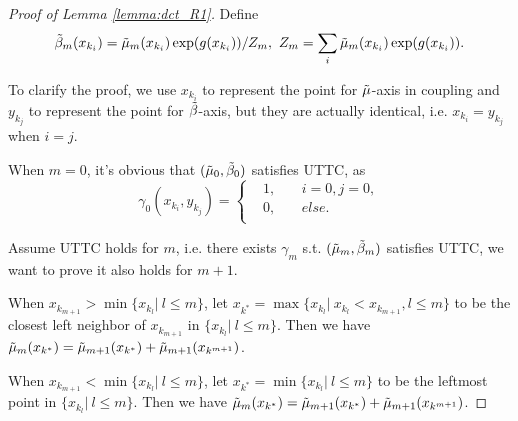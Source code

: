 \documentclass[nohyperref]{article}
\theoremstyle{plain}
\begin{document}
\begin{proof}[Proof of Lemma \ref{lemma:dct_R1}]
Define 
$$
\Tilde{\beta}_m (x_{k_i}) = \Tilde{\mu}_m (x_{k_i}) \exp(g(x_{k_i})) / Z_m,
\  Z_m = \sum_{i} \Tilde{\mu}_m (x_{k_i}) \exp (g(x_{k_i})).
$$ 

To clarify the proof, we use $x_{k_i}$ to represent the point for $\Tilde{\mu}$-axis in coupling and $y_{k_j}$ to represent the point for $\Tilde{\beta}$-axis, but they are actually identical, i.e. $x_{k_i} = y_{k_j}$ when $i = j$. 

When $m = 0$, it's obvious that $(\Tilde{\mu}_0, \Tilde{\beta}_0)$ satisfies UTTC, as 
\begin{equation*}
    \gamma_0 (x_{k_i}, y_{k_j}) = 
    \left\{
    \begin{aligned}
        &1,& &\ i=0, j=0,\\
        &0,& &\ else. \\
    \end{aligned}
    \right.
\end{equation*}

Assume UTTC holds for $m$, i.e. there exists $\gamma_m$ s.t. $(\Tilde{\mu}_m, \Tilde{\beta}_m)$ satisfies UTTC, we want to prove it also holds for $m+1$.

When $x_{k_{m+1}} > \min\{x_{k_l} |\ l \leq m \}$, let $x_{k^*} = \max \{x_{k_l} | \ x_{k_l} < x_{k_{m+1}}, l \leq m \}$ to be the closest left neighbor of $x_{k_{m+1}}$ in $\{x_{k_l}|\ l \leq m \}$.
Then we have $\Tilde{\mu}_{m} (x_{k^*}) = \Tilde{\mu}_{m+1} (x_{k^*}) + \Tilde{\mu}_{m+1} (x_{k^{m+1}})$.

When $x_{k_{m+1}} < \min\{x_{k_l} |\ l \leq m \}$, let $x_{k^*} = \min\{x_{k_l} |\ l \leq m \}$ to be the leftmost point in $\{x_{k_l}|\  l \leq m \}$. 
Then we have $\Tilde{\mu}_{m} (x_{k^*}) = \Tilde{\mu}_{m+1} (x_{k^*}) + \Tilde{\mu}_{m+1} (x_{k^{m+1}})$.


\end{proof}
\end{document}
